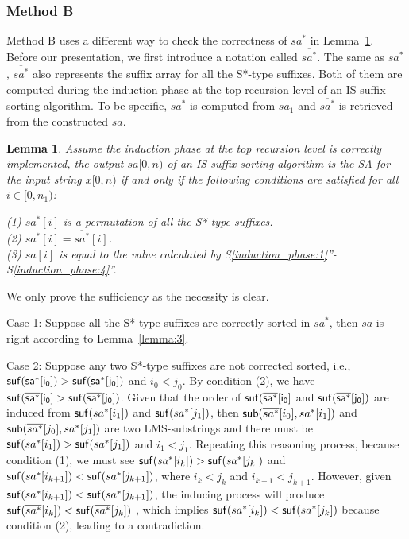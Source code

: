 \documentclass[10pt,journal,compsoc]{IEEEtran}
\newtheorem{lemma}[theorem]{Lemma}
\begin{document}
\subsubsection{Method B}\label{sec:proposals:method_b}

Method B uses a different way to check the correctness of $sa^*$ in Lemma~\ref{lemma:4}. Before our presentation, we first introduce a notation called $\overline{sa^*}$. The same as $sa^*$, $\overline{sa^*}$ also represents the suffix array for all the S*-type suffixes. Both of them are computed during the induction phase at the top recursion level of an IS suffix sorting algorithm. To be specific, $sa^*$ is computed from $sa_1$ and $\overline{sa^*}$ is retrieved from the constructed $sa$.

\begin{lemma} \label{lemma:4}
    Assume the induction phase at the top recursion level is correctly implemented, the output $sa[0, n)$ of an IS suffix sorting algorithm is the SA for the input string $x[0, n)$ if and only if the following conditions are satisfied for all $i \in [0, n_1)$:

	(1) $sa^*[i]$ is a permutation of all the S*-type suffixes. \\
	(2) $sa^*[i] = \overline{sa^*}[i]$. \\
	(3) $sa[i]$ is equal to the value calculated by S\ref{induction_phase:1}''-S\ref{induction_phase:4}''. \\

\end{lemma}

\begin{IEEEproof}

    We only prove the sufficiency as the necessity is clear.

    Case 1: Suppose all the S*-type suffixes are correctly sorted in $sa^*$, then $sa$ is right according to Lemma~\ref{lemma:3}.

    Case 2: Suppose any two S*-type suffixes are not corrected sorted, i.e., $\sf suf(sa^*[i_0]) > \sf suf(sa^*[j_0])$ and $i_0 < j_0$. By condition (2), we have $\sf suf(\overline{sa^*}[i_0] > \sf suf(\overline{sa^*}[j_0])$. Given that the order of $\sf suf(\overline{sa^*}[i_0]$ and $\sf suf(\overline{sa^*}[j_0])$ are induced from ${\sf suf}(sa^*[i_1])$ and ${\sf suf}(sa^*[j_1])$, then ${\sf sub}(\overline{sa^*}[i_0], sa^*[i_1])$ and ${\sf sub}(\overline{sa^*}[j_0], sa^*[j_1])$ are two LMS-substrings and there must be ${\sf suf}(sa^*[i_1])>{\sf suf}(sa^*[j_1])$ and $i_1 < j_1$. Repeating this reasoning process, because condition (1), we must see ${\sf suf}(sa^*[i_k])>{\sf suf}(sa^*[j_k])$ and ${\sf suf}(sa^*[i_{k+1}])<{\sf suf}(sa^*[j_{k+1}])$, where $i_k < j_k$ and $i_{k+1} < j_{k+1}$. However, given ${\sf suf}(sa^*[i_{k+1}])<{\sf suf}(sa^*[j_{k+1}])$, the inducing process will produce ${\sf suf}(\overline{sa^*}[i_k])<{\sf suf}(\overline{sa^*}[j_k])$ , which implies ${\sf suf}(sa^*[i_k])<{\sf suf}(sa^*[j_k])$ because condition (2), leading to a contradiction.
	
\end{IEEEproof}
	
\end{document}
